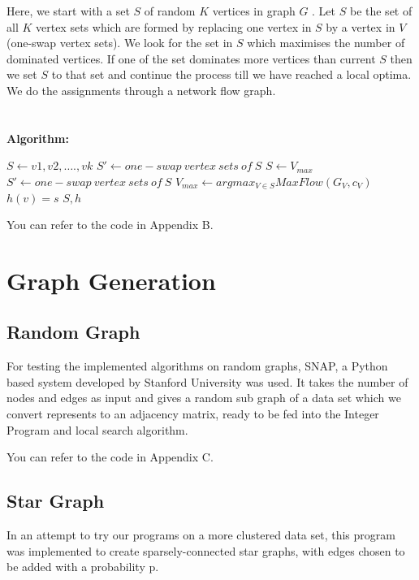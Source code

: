 \documentclass[12pt,a4paper,onecolumn]{article}
\begin{document}
Here, we start with a set $S$ of random $K$ vertices in graph $G$ . Let $S$ be the set of all $K$ vertex sets which are formed by replacing one vertex in $S$ by a vertex in $V$ (one-swap vertex sets). We look for the set in $S$ which maximises the number of dominated vertices. If one of the set dominates more vertices than current $S$ then we set $S$ to that set and continue the process till we have reached a local optima. We do the assignments through a network flow graph.\\\\\\
\textbf{Algorithm:}
\begin{algorithmic}[1]
\STATE $S \leftarrow {v1, v2,…., vk}$
\STATE $S' \leftarrow {one-swap\: vertex\: sets\: of\: S}$
\STATE $S \leftarrow V_{max}$
\STATE $S' \leftarrow {one-swap\: vertex\: sets \: of\: S}$
\STATE $V_{max} \leftarrow argmax _{V \in S} MaxFlow(G_V , c_V )$
\ENDWHILE 
{}
\STATE $h(v) = s$
\ENDIF
\ENDFOR
\RETURN $S, h$
\ENDIF
\end{algorithmic}


You can refer to the code in Appendix B.






\section{Graph Generation}
\subsection{Random Graph}
For testing the implemented algorithms on random graphs, SNAP, a Python based system developed by Stanford University was used. It takes the number of nodes and edges as input and gives a random sub graph of a data set which we convert represents to an adjacency matrix, ready to be fed into the Integer Program and local search algorithm.

You can refer to the code in Appendix C.

\subsection{Star Graph}
In an attempt to try our programs on a more clustered data set, this program was implemented to create sparsely-connected star graphs, with edges chosen to be added with a probability p.
\end{document}
